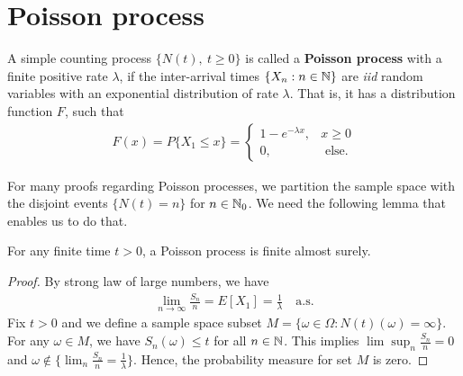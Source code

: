 \documentclass[a4paper,10pt,english]{article}
\begin{document}
\section{Poisson process}
A simple counting process $\{N(t),~ t\geqslant 0\} $ is called a \textbf{Poisson process} with a finite positive rate $\lambda$, 
if the inter-arrival times $\{X_{n}: n \in \mathbb{N}\}$ are \textit{iid} random variables with an exponential distribution of rate $\lambda$. 
That is, it has a distribution function $F$, such that 
 \begin{align*}
 F(x) = P\{X_{1}\leqslant x\} = 
	\begin{cases}
		1-e^{-\lambda x}, & x\geqslant 0   \\
		0,  & \text{ else}.
	\end{cases}
\end{align*}

For many proofs regarding Poisson processes, 
we partition the sample space with the disjoint events $\{N(t) = n\}$ for $n \in \mathbb{N}_0$. 
We need the following lemma that enables us to do that. 
\begin{lem} For any finite time $t > 0$, a Poisson process is finite almost surely.
\end{lem}
\begin{proof} By strong law of large numbers, we have 
\begin{align*}
\lim_{n \to \infty} \frac{S_{n}}{n} = E[X_{1}] = \frac{1}{\lambda}\quad\mathrm{a.s.} 
\end{align*}
Fix $t > 0$ and we define a sample space subset $M = \{\omega \in \Omega: N(t)(\omega) = \infty \}$. 
For any $\omega \in M$, we have $S_{n}(\omega)\leqslant t$ for all $n \in \mathbb{N}$. 
This implies $\lim\sup_n\frac{S_{n}}{n} = 0$  and $\omega \not\in \{\lim_n \frac{S_{n}}{n} = \frac{1}{\lambda} \}.$ Hence, the probability measure for set $M$ is zero. 
\end{proof}
\end{document}
